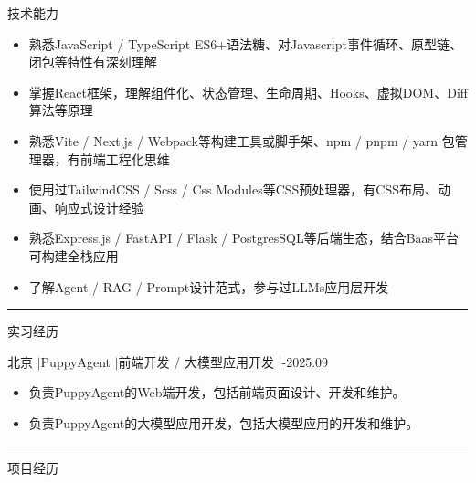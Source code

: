 \documentclass[11pt,a4paper]{ctexart}
\begin{document}
{\heiti 技术能力}
\begin{itemize}[itemsep=0pt,parsep=0pt,topsep=0pt]
    \item {\songti 熟悉JavaScript / TypeScript ES6+语法糖、对Javascript事件循环、原型链、闭包等特性有深刻理解}
    \item {\songti 掌握React框架，理解组件化、状态管理、生命周期、Hooks、虚拟DOM、Diff算法等原理}
    \item {\songti 熟悉Vite / Next.js / Webpack等构建工具或脚手架、npm / pnpm / yarn 包管理器，有前端工程化思维}
    \item {\songti 使用过TailwindCSS / Scss / Css Modules等CSS预处理器，有CSS布局、动画、响应式设计经验}
    \item {\songti 熟悉Express.js / FastAPI / Flask / PostgresSQL等后端生态，结合Baas平台可构建全栈应用}
    \item {\songti 了解Agent / RAG / Prompt设计范式，参与过LLMs应用层开发}
\end{itemize}

\vspace{1em}
\hrule
\vspace{1em}

{\heiti 实习经历}

{\heiti 北京 \quad$|$\quad PuppyAgent \quad$|$\quad 前端开发 / 大模型应用开发 \quad$|$-2025.09}

\begin{itemize}[itemsep=0pt,parsep=0pt,topsep=0pt]
    \item 负责PuppyAgent的Web端开发，包括前端页面设计、开发和维护。
    \item 负责PuppyAgent的大模型应用开发，包括大模型应用的开发和维护。
\end{itemize}

\vspace{1em}
\hrule
\vspace{1em}

{\heiti 项目经历}
\end{document}
